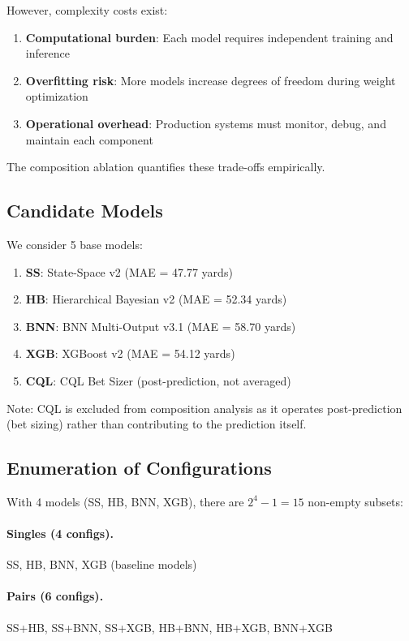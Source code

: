 However, complexity costs exist:
\begin{enumerate}
  \item \textbf{Computational burden}: Each model requires independent training and inference
  \item \textbf{Overfitting risk}: More models increase degrees of freedom during weight optimization
  \item \textbf{Operational overhead}: Production systems must monitor, debug, and maintain each component
\end{enumerate}

The composition ablation quantifies these trade-offs empirically.

\subsection{Candidate Models}

We consider 5 base models:
\begin{enumerate}
  \item \textbf{SS}: State-Space v2 (MAE = 47.77 yards)
  \item \textbf{HB}: Hierarchical Bayesian v2 (MAE = 52.34 yards)
  \item \textbf{BNN}: BNN Multi-Output v3.1 (MAE = 58.70 yards)
  \item \textbf{XGB}: XGBoost v2 (MAE = 54.12 yards)
  \item \textbf{CQL}: CQL Bet Sizer (post-prediction, not averaged)
\end{enumerate}

Note: CQL is excluded from composition analysis as it operates post-prediction (bet sizing) rather than contributing to the prediction itself.

\subsection{Enumeration of Configurations}

With 4 models (SS, HB, BNN, XGB), there are $2^4 - 1 = 15$ non-empty subsets:

\paragraph{Singles (4 configs).}
SS, HB, BNN, XGB (baseline models)

\paragraph{Pairs (6 configs).}
SS+HB, SS+BNN, SS+XGB, HB+BNN, HB+XGB, BNN+XGB

